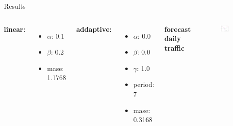 \documentclass{beamer}
\begin{document}
    \begin{frame}{Results}
    \begin{columns}[c]
      \textbf{linear:}
      \begin{itemize}
	\item $\alpha$: 0.1 
	\item $\beta$: 0.2
	\item mase: 1.1768
      \end{itemize}
      
      \textbf{addaptive:}
      \begin{itemize}
	\item $\alpha$: 0.0 
	\item $\beta$: 0.0
	\item $\gamma$: 1.0
	\item period: 7
	\item mase: 0.3168
      \end{itemize}
    
      \textbf{forecast daily traffic}
      \begin{figure}
	\includegraphics[width=1.1\textwidth]{images/daily.png}
      \end{figure}
    \end{columns}
  \end{frame}
\end{document}
